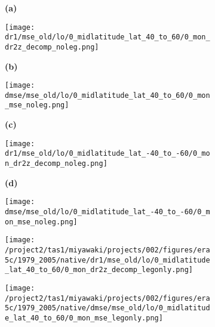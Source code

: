 \documentclass[preview]{standalone}
\begin{document}
\begin{figure}
  \begin{subfigure}[t]{0.05\textwidth}
    \textbf{\normalsize{(a)}}
  \end{subfigure}
  \begin{subfigure}[t]{0.45\textwidth}
    \texttt{[image: dr1/mse\_old/lo/0\_midlatitude\_lat\_40\_to\_60/0\_mon\_dr2z\_decomp\_noleg.png]}
  \end{subfigure}
  \begin{subfigure}[t]{0.05\textwidth}
    \textbf{\normalsize{(b)}}
  \end{subfigure}
  \begin{subfigure}[t]{0.45\textwidth}
    \texttt{[image: dmse/mse\_old/lo/0\_midlatitude\_lat\_40\_to\_60/0\_mon\_mse\_noleg.png]}
  \end{subfigure}

  \begin{subfigure}[t]{0.05\textwidth}
    \textbf{\normalsize{(c)}}
  \end{subfigure}
  \begin{subfigure}[t]{0.45\textwidth}
    \texttt{[image: dr1/mse\_old/lo/0\_midlatitude\_lat\_-40\_to\_-60/0\_mon\_dr2z\_decomp\_noleg.png]}
  \end{subfigure}
  \begin{subfigure}[t]{0.05\textwidth}
    \textbf{\normalsize{(d)}}
  \end{subfigure}
  \begin{subfigure}[t]{0.45\textwidth}
    \texttt{[image: dmse/mse\_old/lo/0\_midlatitude\_lat\_-40\_to\_-60/0\_mon\_mse\_noleg.png]}
  \end{subfigure}

  \begin{subfigure}[t]{0.05\textwidth}
  \end{subfigure}
  \begin{subfigure}[t]{0.45\textwidth}
    \texttt{[image: /project2/tas1/miyawaki/projects/002/figures/era5c/1979\_2005/native/dr1/mse\_old/lo/0\_midlatitude\_lat\_40\_to\_60/0\_mon\_dr2z\_decomp\_legonly.png]}
  \end{subfigure}
  \begin{subfigure}[t]{0.1\textwidth}
  \end{subfigure}
  \begin{subfigure}[t]{0.4\textwidth}
    \texttt{[image: /project2/tas1/miyawaki/projects/002/figures/era5c/1979\_2005/native/dmse/mse\_old/lo/0\_midlatitude\_lat\_40\_to\_60/0\_mon\_mse\_legonly.png]}
  \end{subfigure}

\end{figure}
\end{document}
